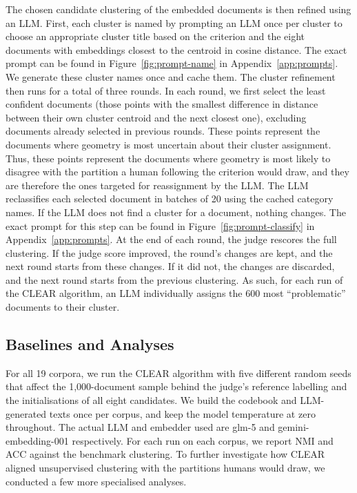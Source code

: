 \documentclass[11pt,a4paper,oneside]{report}
\begin{document}
The chosen candidate clustering of the embedded documents is then refined using an LLM. First, each cluster is named by prompting an LLM once per cluster to choose an appropriate cluster title based on the criterion and the eight documents with embeddings closest to the centroid in cosine distance. The exact prompt can be found in Figure~\ref{fig:prompt-name} in Appendix~\ref{app:prompts}. We generate these cluster names once and cache them. The cluster refinement then runs for a total of three rounds. In each round, we first select the least confident documents (those points with the smallest difference in distance between their own cluster centroid and the next closest one), excluding documents already selected in previous rounds. These points represent the documents where geometry is most uncertain about their cluster assignment. Thus, these points represent the documents where geometry is most likely to disagree with the partition a human following the criterion would draw, and they are therefore the ones targeted for reassignment by the LLM. The LLM reclassifies each selected document in batches of 20 using the cached category names. If the LLM does not find a cluster for a document, nothing changes. The exact prompt for this step can be found in Figure~\ref{fig:prompt-classify} in Appendix~\ref{app:prompts}. At the end of each round, the judge rescores the full clustering. If the judge score improved, the round's changes are kept, and the next round starts from these changes. If it did not, the changes are discarded, and the next round starts from the previous clustering. As such, for each run of the CLEAR algorithm, an LLM individually assigns the 600 most ``problematic'' documents to their cluster.

\subsection{Baselines and Analyses}

For all 19 corpora, we run the CLEAR algorithm with five different random seeds that affect the 1{,}000-document sample behind the judge's reference labelling and the initialisations of all eight candidates. We build the codebook and LLM-generated texts once per corpus, and keep the model temperature at zero throughout. The actual LLM and embedder used are {\small\ttfamily glm-5} and {\small\ttfamily gemini-embedding-001} \citep{lee2025gemini} respectively. For each run on each corpus, we report NMI and ACC against the benchmark clustering. To further investigate how CLEAR aligned unsupervised clustering with the partitions humans would draw, we conducted a few more specialised analyses.
\end{document}
